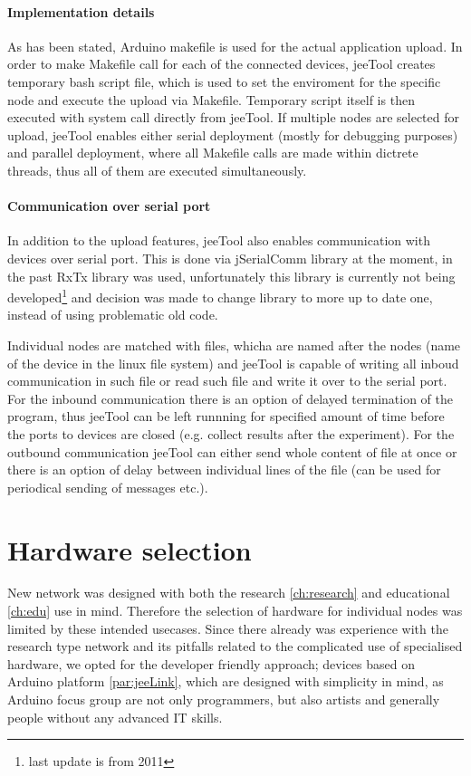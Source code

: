 \documentclass[
  digital, %
  table,   %
  nolof,     %
  nolot,     %
           oneside
]{fithesis3}
\begin{document}
\paragraph{Implementation details}
  As has been stated, Arduino makefile is used for the actual application upload. In order to make Makefile call for each of the connected devices, jeeTool creates temporary bash script file, which is used to set the enviroment for the specific node and execute the upload via Makefile. Temporary script itself is then executed with system call directly from jeeTool. If multiple nodes are selected for upload, jeeTool enables either serial deployment (mostly for debugging purposes) and parallel deployment, where all Makefile calls are made within dictrete threads, thus all of them are executed simultaneously.

\paragraph{Communication over serial port}
  In addition to the upload features, jeeTool also enables communication with devices over serial port. This is done via jSerialComm library \cite{jserial}
  at the moment, in the past RxTx library \cite{rxtx}
  was used, unfortunately this library is currently not being developed\footnote{last update is from 2011} and decision was made to change library to more up to date one, instead of using problematic old code.

  Individual nodes are matched with files, whicha are named after the nodes (name of the device in the linux file system) and jeeTool is capable of writing all inboud communication in such file or read such file and write it over to the serial port. For the inbound communication there is an option of delayed termination of the program, thus jeeTool can be left runnning for specified amount of time before the ports to devices are closed (e.g. collect results after the experiment). For the outbound communication jeeTool can either send whole content of file at once or there is an option of delay between individual lines of the file (can be used for periodical sending of messages etc.).

  \section{Hardware selection}\label{sec:hw}
  New network was designed with both the research \ref{ch:research} and educational \ref{ch:edu} use in mind. Therefore the selection of hardware for individual nodes was limited by these intended usecases. Since there already was experience with the research type network \cite{Matyas2015}
  and its pitfalls related to the complicated use of specialised hardware, we opted for the developer friendly approach; devices based on Arduino platform \ref{par:jeeLink}, which are designed with simplicity in mind, as Arduino focus group are not only programmers, but also artists and generally people without any advanced IT skills.
\end{document}
